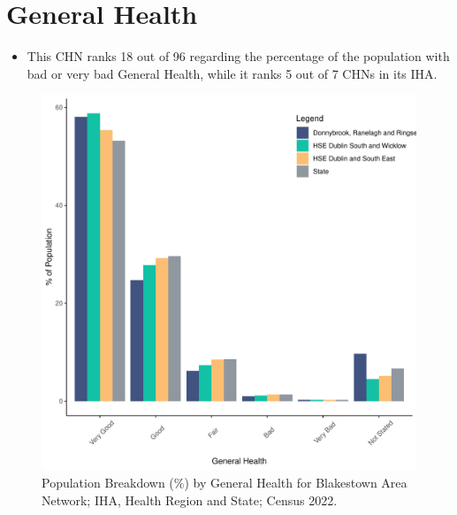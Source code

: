 \documentclass{article}
\begin{document}
\pagebreak

\section{General Health}\label{sect:GenHealth}
\begin{itemize}
\item  This CHN ranks  18 out of 96 regarding the percentage of the population with bad or very bad General Health, while it ranks   5 out of 7 CHNs in its IHA.
\end{itemize}
\begin{figure}[h]
	\centering
	\includegraphics[width = 150mm]{../figures/GenED.pdf}
	\caption{Population Breakdown (\%) by General Health for Blakestown Area Network; IHA, Health Region and State;  Census 2022.}
	\label{fig:2ae19629-1a6a-13a3-e055-000000000001}
	\end{figure}
\end{document}

